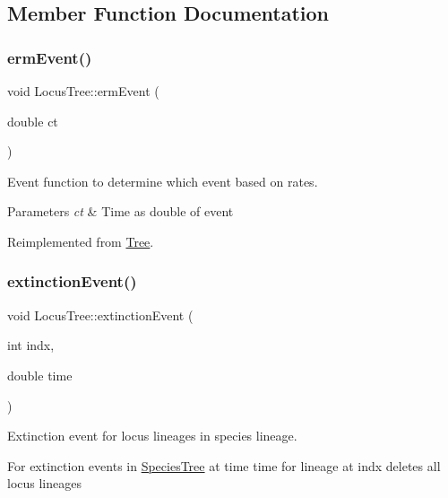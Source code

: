 \subsection{Member Function Documentation}
\mbox{\label{class_locus_tree_ac26a76f2505dc80a9e45a501f5463427}} 
\subsubsection{\texorpdfstring{ermEvent()}{ermEvent()}}
{\footnotesize\ttfamily void Locus\+Tree\+::erm\+Event (\begin{DoxyParamCaption}\item[{double}]{ct }\end{DoxyParamCaption})\hspace{0.3cm}{\ttfamily [virtual]}}



Event function to determine which event based on rates. 


\begin{DoxyParams}{Parameters}
{\em ct} & Time as double of event \\
\hline
\end{DoxyParams}


Reimplemented from \mbox{\hyperlink{class_tree}{Tree}}.

\mbox{\label{class_locus_tree_a3834ac0ce434f88fabd27de70c950076}} 
\subsubsection{\texorpdfstring{extinctionEvent()}{extinctionEvent()}}
{\footnotesize\ttfamily void Locus\+Tree\+::extinction\+Event (\begin{DoxyParamCaption}\item[{int}]{indx,  }\item[{double}]{time }\end{DoxyParamCaption})}



Extinction event for locus lineages in species lineage. 

For extinction events in \mbox{\hyperlink{class_species_tree}{Species\+Tree}} at time time for lineage at indx deletes all locus lineages


